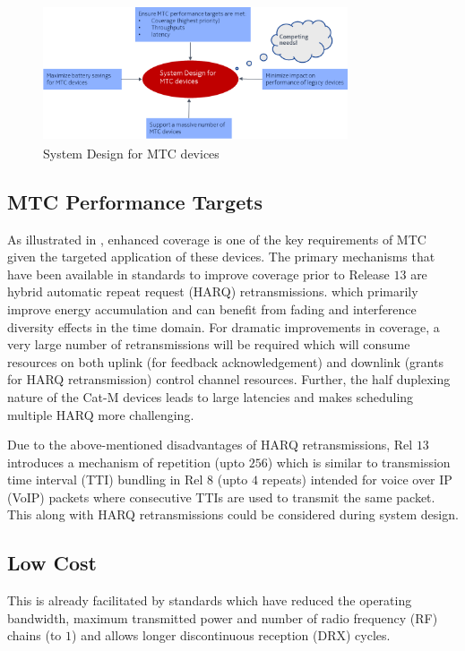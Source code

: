 \documentclass[conference,compsoc]{IEEEtran}
\begin{document}
\begin{figure}[htbp]
\centerline{\includegraphics[height=40mm,width=90mm]{sys_design.png}}
\caption{System Design for MTC devices}
\label{fig_sys_design}
\end{figure}

\subsection{MTC Performance Targets}
As illustrated in \cite{alberto}, enhanced coverage is one of the key requirements of   MTC given the targeted application of these devices. The primary mechanisms that have been available in standards to improve coverage prior to Release $13$ are hybrid automatic repeat request (HARQ) retransmissions. which primarily improve energy accumulation and can benefit from fading and interference diversity effects in the time domain.  For dramatic improvements in coverage, a very large number of retransmissions will be required which will consume resources on both uplink (for feedback acknowledgement) and downlink (grants for HARQ retransmission) control channel resources. Further, the half duplexing nature of the Cat-M devices leads to large latencies and makes scheduling multiple HARQ more challenging. 

Due to the above-mentioned disadvantages of HARQ retransmissions, Rel $13$ introduces a mechanism of repetition (upto $256$) which is similar to transmission time interval (TTI) bundling in Rel $8$ (upto $4$ repeats) intended for voice over IP (VoIP) packets where consecutive TTIs are used to transmit the same packet. This along with HARQ retransmissions could be considered during system design. 


\subsection{Low Cost}
This is already facilitated by standards which have reduced the operating bandwidth, maximum transmitted power and number of radio frequency (RF) chains (to $1$) and allows longer discontinuous reception (DRX) cycles.
\end{document}
